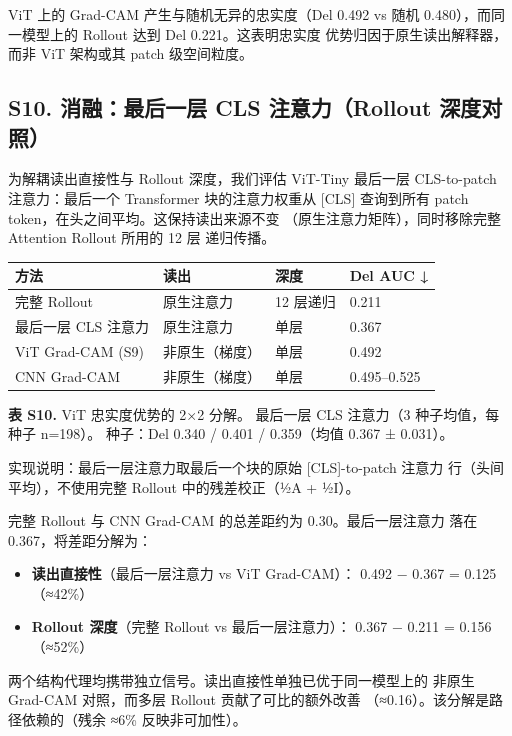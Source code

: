 \documentclass[11pt,a4paper]{article}
\begin{document}
ViT 上的 Grad-CAM 产生与随机无异的忠实度（Del 0.492 vs 随机 0.480），而同一模型上的 Rollout 达到 Del 0.221。这表明忠实度 优势归因于原生读出解释器，而非 ViT 架构或其 patch 级空间粒度。

\subsection*{S10. 消融：最后一层 CLS 注意力（Rollout 深度对照）}

为解耦读出直接性与 Rollout 深度，我们评估 ViT-Tiny 最后一层 CLS-to-patch 注意力：最后一个 Transformer 块的注意力权重从 [CLS] 查询到所有 patch token，在头之间平均。这保持读出来源不变 （原生注意力矩阵），同时移除完整 Attention Rollout 所用的 12 层 递归传播。

\begin{tabular}{llll}
\toprule
方法 & 读出 & 深度 & Del AUC ↓ \\
\midrule
完整 Rollout & 原生注意力 & 12 层递归 & 0.211 \\
最后一层 CLS 注意力 & 原生注意力 & 单层 & 0.367 \\
ViT Grad-CAM (S9) & 非原生（梯度） & 单层 & 0.492 \\
CNN Grad-CAM & 非原生（梯度） & 单层 & 0.495–0.525 \\
\bottomrule
\end{tabular}


\textbf{表 S10.} ViT 忠实度优势的 2×2 分解。 最后一层 CLS 注意力（3 种子均值，每种子 n=198）。 种子：Del 0.340 / 0.401 / 0.359（均值 0.367 ± 0.031）。

实现说明：最后一层注意力取最后一个块的原始 [CLS]-to-patch 注意力 行（头间平均），不使用完整 Rollout 中的残差校正（½A + ½I）。

完整 Rollout 与 CNN Grad-CAM 的总差距约为 0.30。最后一层注意力 落在 0.367，将差距分解为：

\begin{itemize}
\item \textbf{读出直接性}（最后一层注意力 vs ViT Grad-CAM）： 0.492 − 0.367 = 0.125（≈42\%）
\item \textbf{Rollout 深度}（完整 Rollout vs 最后一层注意力）： 0.367 − 0.211 = 0.156（≈52\%）
\end{itemize}

两个结构代理均携带独立信号。读出直接性单独已优于同一模型上的 非原生 Grad-CAM 对照，而多层 Rollout 贡献了可比的额外改善 （≈0.16）。该分解是路径依赖的（残余 ≈6\% 反映非可加性）。
\end{document}
